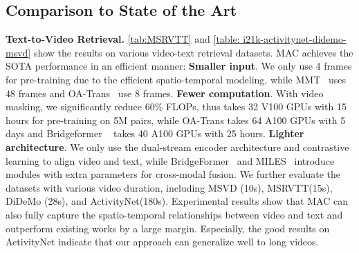 \documentclass[10pt,twocolumn,letterpaper]{article}
\begin{document}
\vspace{-1mm}\subsection{Comparison to State of the Art}
\label{sec:sota result}
\noindent\textbf{Text-to-Video Retrieval.} \cref{tab:MSRVTT} and \cref{table: i21k-activitynet-didemo-msvd} show the results on various video-text retrieval datasets. MAC achieves the SOTA performance in an efficient manner: \textbf{Smaller input}. We only use 4 frames for pre-training due to the efficient spatio-temporal modeling, while MMT~\cite{taco} uses 48 frames and OA-Trans~\cite{OA-Trans} use 8 frames. \textbf{Fewer computation}. With video masking, we significantly reduce 60\% FLOPs, thus takes 32 V100 GPUs with 15 hours for pre-training on 5M pairs, while OA-Trans takes 64 A100 GPUs with 5 days and Bridgeformer ~\cite{BridgeFormer} takes 40 A100 GPUs with 25 hours. \textbf{Lighter architecture}. We only use the dual-stream encoder architecture and contrastive learning to align video and text, while BridgeFormer~\cite{BridgeFormer} and MILES~\cite{miles} introduce modules with extra parameters for cross-modal fusion. We further evaluate the datasets with various video duration, including MSVD (10s), MSRVTT(15s), DiDeMo (28s), and ActivityNet(180s). Experimental results show that MAC can also fully capture the spatio-temporal relationships between video and text and outperform existing works by a large margin. Especially, the good results on ActivityNet indicate that our approach can generalize well to long videos.

\begin{table}[]
    \centering
    \caption{Text-to-image retrieval results on Flickr30k. Our approach achieves a competitive result with custom designs such strong as data augmentations and multi-scale fusion.}
    \label{tab:Flickr30k}
    \end{table}
\end{document}

